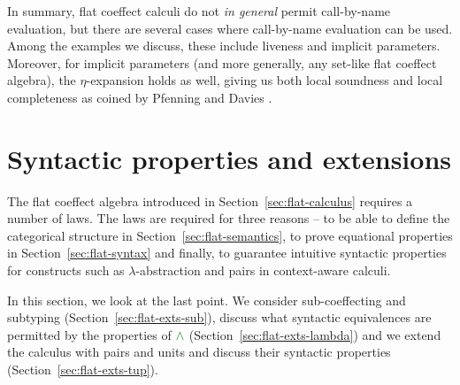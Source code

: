 \noindent
In summary, flat coeffect calculi do not \emph{in general} permit call-by-name evaluation, but
there are several cases where call-by-name evaluation can be used. Among the examples we discuss,
these include liveness and implicit parameters. Moreover, for implicit parameters (and more
generally, any set-like flat coeffect algebra), the $\eta$-expansion holds as well, giving us
both local soundness and local completeness as coined by Pfenning and Davies \cite{logic-modal-reconstruction}.



%
%

\section{Syntactic properties and extensions}
\label{sec:flat-exts}

The flat coeffect algebra introduced in Section~\ref{sec:flat-calculus} requires a number of laws.
The laws are required for three reasons -- to be able to define the categorical structure
in Section~\ref{sec:flat-semantics}, to prove equational properties in Section~\ref{sec:flat-syntax}
and finally, to guarantee intuitive syntactic properties for constructs such as
$\lambda$-abstraction and pairs in context-aware calculi.

In this section, we look at the last point. We consider sub-coeffecting and subtyping
(Section~\ref{sec:flat-exts-sub}), discuss what syntactic equivalences are permitted
by the properties of $\czip$ (Section~\ref{sec:flat-exts-lambda}) and we extend the calculus with
pairs and units and discuss their syntactic properties (Section~\ref{sec:flat-exts-tup}).



